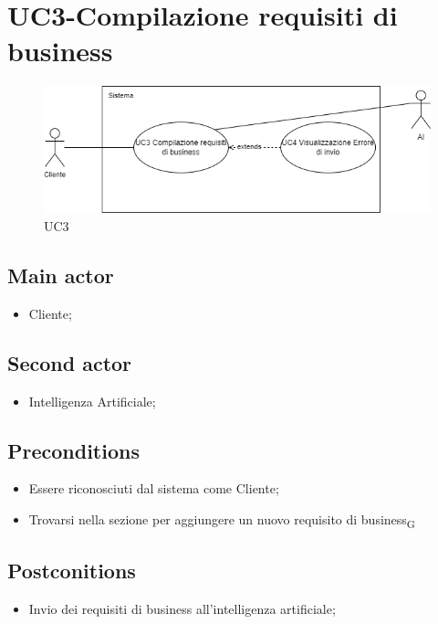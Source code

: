 \documentclass{article}
\begin{document}
    
\section{UC3-Compilazione requisiti di business}
    \begin{figure}[h]
      \centering
      \includegraphics[width=.8\textwidth, height=.6\textheight, keepaspectratio]{./imgUML/UC3.png}
            \caption{UC3}
      \label{fig:UC3}
    \end{figure}
     \subsection*{Main actor}
     \begin{itemize}
         \item Cliente;
     \end{itemize}
      \subsection*{Second actor}
     \begin{itemize}
         \item Intelligenza Artificiale;
     \end{itemize}
     \subsection*{Preconditions} 
     \begin{itemize}
         \item Essere riconosciuti dal sistema come Cliente;
         \item Trovarsi nella sezione per aggiungere un nuovo requisito di business\textsubscript{G} 
     \end{itemize}
     \subsection*{Postconitions} 
        \begin{itemize}
            \item Invio dei requisiti di business all'intelligenza artificiale;
        \end{itemize}
        
\end{document}
